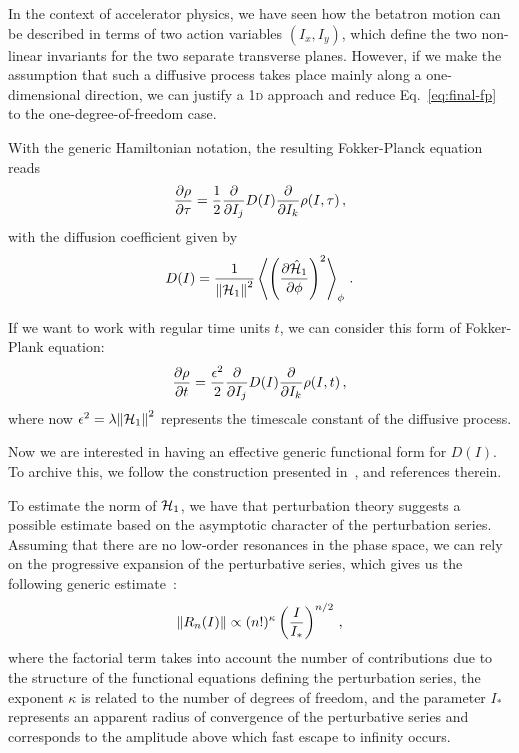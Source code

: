 In the context of accelerator physics, we have seen how the betatron motion can be described in terms of two action variables $(I_x, I_y)$, which define the two non-linear invariants for the two separate transverse planes. However, if we make the assumption that such a diffusive process takes place mainly along a one-dimensional direction, we can justify a 1\textsc{d} approach and reduce Eq.~\eqref{eq:final-fp} to the one-degree-of-freedom case.

With the generic Hamiltonian notation, the resulting Fokker-Planck equation reads
\begin{equation}
    \pdv{\rho}{\tau}=\frac{1}{2}\pdv{}{I_j} D(I) \pdv{}{I_k}\rho(I,\tau)\,,
\end{equation}
with the diffusion coefficient given by
\begin{equation}
    D(I) = \frac{1}{\norm{\mathcal{H}_1}^2} \left\langle \left( \pdv{\hat{\mathcal{H}}_1}{\phi} \right)^2 \right\rangle_\phi \,.
\end{equation}

If we want to work with regular time units $t$, we can consider this form of Fokker-Plank equation:
\begin{equation}
    \pdv{\rho}{t}=\frac{\epsilon^2}{2}\pdv{}{I_j} D(I) \pdv{}{I_k}\rho(I,t)\,,
    \label{eq:fp}
\end{equation}
where now $\epsilon^2 = \lambda\norm{\mathcal{H}_1}^2$ represents the timescale constant of the diffusive process.

Now we are interested in having an effective generic functional form for $D(I)$. To archive this, we follow the construction presented in~\cite{Bazzani:2019lse}, and references therein.

To estimate the norm of $\mathcal{H}_1$, we have that perturbation theory suggests a possible estimate based on the asymptotic character of the perturbation series. Assuming that there are no low-order resonances in the phase space, we can rely on the progressive expansion of the perturbative series, which gives us the following generic estimate~\cite{Bazzani:1990aa}:
\begin{equation}
    \norm{R_n(I)} \propto (n!)^\kappa \left(\frac{I}{I_\ast}\right)^{n/2}\,,
\end{equation}
where the factorial term takes into account the number of contributions due to the structure of the functional equations defining the perturbation series, the exponent $\kappa$ is related to the number of degrees of freedom, and the parameter $I_\ast$ represents an apparent radius of convergence of the perturbative series and corresponds to the amplitude above which fast escape to infinity occurs.

